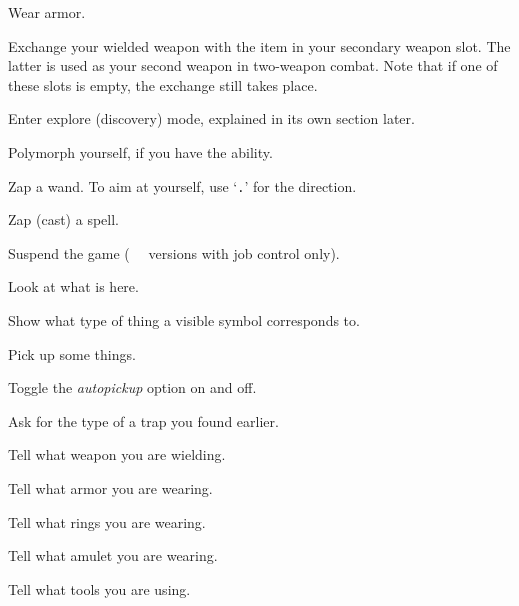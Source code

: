 \item[\tb{{\rm W}}]
Wear armor.

\item[\tb{{\rm x}}]
Exchange your wielded weapon with the item in your secondary
weapon slot.  The latter is used as your second weapon in
two-weapon combat.  Note that if one of these slots is empty,
the exchange still takes place.

\item[\tb{{\rm X}}]
Enter explore (discovery) mode, explained in its own section later.

\item[\tb{\^{}{\rm Y}}]
Polymorph yourself, if you have the ability.

\item[\tb{{\rm z}}]
Zap a wand.  To aim at yourself, use `{\tt .}' for the direction.

\item[\tb{{\rm Z}}]
Zap (cast) a spell.

\item[\tb{\^{}{\rm Z}}]
Suspend the game
(\UNIX\  versions with job control only).

\item[\tb{:}]
Look at what is here.

\item[\tb{;}]
Show what type of thing a visible symbol corresponds to.

\item[\tb{,}]
Pick up some things.

\item[\tb{@}]
Toggle the
{\it autopickup\/} 
option on and off.

\item[\tb{\^{}}]
Ask for the type of a trap you found earlier.

\item[\tb{)}]
Tell what weapon you are wielding.

\item[\tb{[}]
Tell what armor you are wearing.

\item[\tb{=}]
Tell what rings you are wearing.

\item[\tb{"}]
Tell what amulet you are wearing.

\item[\tb{(}]
Tell what tools you are using.

